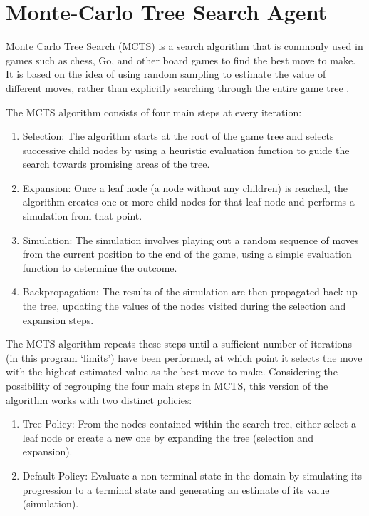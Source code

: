 \section{Monte-Carlo Tree Search Agent}
\label{MCTS}

Monte Carlo Tree Search (MCTS) is a search algorithm that is commonly used in games such as chess, Go, and other board games to find the best move to make. It is based on the idea of using random sampling to estimate the value of different moves, rather than explicitly searching through the entire game tree \citep{MCTSSurvey}.

The MCTS algorithm consists of four main steps at every iteration:

\begin{enumerate}
	\item Selection: The algorithm starts at the root of the game tree and selects successive child nodes by using a heuristic evaluation function to guide the search towards promising areas of the tree.
	
	\item Expansion: Once a leaf node (a node without any children) is reached, the algorithm creates one or more child nodes for that leaf node and performs a simulation from that point.
	
	\item Simulation: The simulation involves playing out a random sequence of moves from the current position to the end of the game, using a simple evaluation function to determine the outcome.
	
	\item Backpropagation: The results of the simulation are then propagated back up the tree, updating the values of the nodes visited during the selection and expansion steps.
	
\end{enumerate}

The MCTS algorithm repeats these steps until a sufficient number of iterations (in this program `limits') have been performed, at which point it selects the move with the highest estimated value as the best move to make. Considering the possibility of regrouping the four main steps in MCTS, this version of the algorithm works with two distinct policies: 

\begin{enumerate}
	\item Tree Policy: From the nodes contained within the search tree, either select a leaf node or create a new one by expanding the tree (selection and expansion).
	
	\item Default Policy: Evaluate a non-terminal state in the domain by simulating its progression to a terminal state and generating an estimate of its value (simulation).
\end{enumerate}

